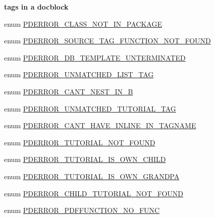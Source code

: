 \begin{Indent}{\bf tags in a docblock}
\begin{DoxyCompactItemize}
\item 
enum \hyperlink{_errors_8inc_a7b67d4ca5c2a01345d2c83f477ada066}{\-P\-D\-E\-R\-R\-O\-R\-\_\-\-C\-L\-A\-S\-S\-\_\-\-N\-O\-T\-\_\-\-I\-N\-\_\-\-P\-A\-C\-K\-A\-G\-E} 
\item 
enum \hyperlink{_errors_8inc_a3f5686fe3ecc09f24aca5a3348b72fdd}{\-P\-D\-E\-R\-R\-O\-R\-\_\-\-S\-O\-U\-R\-C\-E\-\_\-\-T\-A\-G\-\_\-\-F\-U\-N\-C\-T\-I\-O\-N\-\_\-\-N\-O\-T\-\_\-\-F\-O\-U\-N\-D} 
\item 
enum \hyperlink{_errors_8inc_ac3d108b4116df13ab3278265ddf36a29}{\-P\-D\-E\-R\-R\-O\-R\-\_\-\-D\-B\-\_\-\-T\-E\-M\-P\-L\-A\-T\-E\-\_\-\-U\-N\-T\-E\-R\-M\-I\-N\-A\-T\-E\-D} 
\item 
enum \hyperlink{_errors_8inc_a06d339580b7abb4a34c01356931d4099}{\-P\-D\-E\-R\-R\-O\-R\-\_\-\-U\-N\-M\-A\-T\-C\-H\-E\-D\-\_\-\-L\-I\-S\-T\-\_\-\-T\-A\-G} 
\item 
enum \hyperlink{_errors_8inc_a05e88712b3200bcabe491651ed72ecac}{\-P\-D\-E\-R\-R\-O\-R\-\_\-\-C\-A\-N\-T\-\_\-\-N\-E\-S\-T\-\_\-\-I\-N\-\_\-\-B} 
\item 
enum \hyperlink{_errors_8inc_aa7f3e50d2d34ad9f3f3ef276c8b412a2}{\-P\-D\-E\-R\-R\-O\-R\-\_\-\-U\-N\-M\-A\-T\-C\-H\-E\-D\-\_\-\-T\-U\-T\-O\-R\-I\-A\-L\-\_\-\-T\-A\-G} 
\item 
enum \hyperlink{_errors_8inc_aa4d71ddb5c0d5873f3ed773816bd4b21}{\-P\-D\-E\-R\-R\-O\-R\-\_\-\-C\-A\-N\-T\-\_\-\-H\-A\-V\-E\-\_\-\-I\-N\-L\-I\-N\-E\-\_\-\-I\-N\-\_\-\-T\-A\-G\-N\-A\-M\-E} 
\item 
enum \hyperlink{_errors_8inc_a3538e34f34a3b2ddd18668a504c55893}{\-P\-D\-E\-R\-R\-O\-R\-\_\-\-T\-U\-T\-O\-R\-I\-A\-L\-\_\-\-N\-O\-T\-\_\-\-F\-O\-U\-N\-D} 
\item 
enum \hyperlink{_errors_8inc_afec444a7b9e3b4a0b1b04bb1f03a29b5}{\-P\-D\-E\-R\-R\-O\-R\-\_\-\-T\-U\-T\-O\-R\-I\-A\-L\-\_\-\-I\-S\-\_\-\-O\-W\-N\-\_\-\-C\-H\-I\-L\-D} 
\item 
enum \hyperlink{_errors_8inc_a31132bc9af5c4381a4e66860c2f5564c}{\-P\-D\-E\-R\-R\-O\-R\-\_\-\-T\-U\-T\-O\-R\-I\-A\-L\-\_\-\-I\-S\-\_\-\-O\-W\-N\-\_\-\-G\-R\-A\-N\-D\-P\-A} 
\item 
enum \hyperlink{_errors_8inc_a4eae3208f7dd0c7d26890ac528914ca1}{\-P\-D\-E\-R\-R\-O\-R\-\_\-\-C\-H\-I\-L\-D\-\_\-\-T\-U\-T\-O\-R\-I\-A\-L\-\_\-\-N\-O\-T\-\_\-\-F\-O\-U\-N\-D} 
\item 
enum \hyperlink{_errors_8inc_a8b308ece99eb09568c804c9188cf2409}{\-P\-D\-E\-R\-R\-O\-R\-\_\-\-P\-D\-F\-F\-U\-N\-C\-T\-I\-O\-N\-\_\-\-N\-O\-\_\-\-F\-U\-N\-C} 
\item 

\end{DoxyCompactItemize}
\end{Indent}
